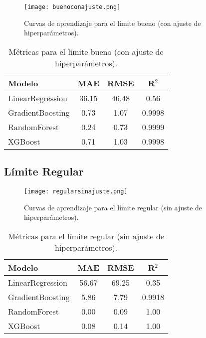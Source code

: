 \documentclass[12pt,a4paper]{article}
\begin{document}
\begin{itemize}
\begin{figure}[H]
    \centering
    \texttt{[image: buenoconajuste.png]}
    \caption{Curvas de aprendizaje para el límite bueno (con ajuste de hiperparámetros).}
\end{figure}
\begin{table}[H]
\centering
\begin{tabular}{lccc}
\toprule
\textbf{Modelo} & \textbf{MAE} & \textbf{RMSE} & \textbf{R$^2$} \\
\midrule
LinearRegression & 36.15 & 46.48 & 0.56 \\
GradientBoosting & 0.73 & 1.07 & 0.9998 \\
RandomForest & 0.24 & 0.73 & 0.9999 \\
XGBoost & 0.71 & 1.03 & 0.9998 \\
\bottomrule
\end{tabular}
\caption{Métricas para el límite bueno (con ajuste de hiperparámetros).}
\end{table}

\subsection*{Límite Regular}
\begin{figure}[H]
    \centering
    \texttt{[image: regularsinajuste.png]}
    \caption{Curvas de aprendizaje para el límite regular (sin ajuste de hiperparámetros).}
\end{figure}
\begin{table}[H]
\centering
\begin{tabular}{lccc}
\toprule
\textbf{Modelo} & \textbf{MAE} & \textbf{RMSE} & \textbf{R$^2$} \\
\midrule
LinearRegression & 56.67 & 69.25 & 0.35 \\
GradientBoosting & 5.86 & 7.79 & 0.9918 \\
RandomForest & 0.00 & 0.09 & 1.00 \\
XGBoost & 0.08 & 0.14 & 1.00 \\
\bottomrule
\end{tabular}
\caption{Métricas para el límite regular (sin ajuste de hiperparámetros).}
\end{table}


\end{itemize}
\end{document}
